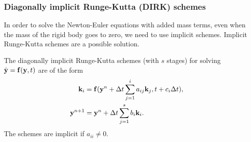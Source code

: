 \subsubsection{Diagonally implicit Runge-Kutta (DIRK) schemes}  \label{sec:DIRK}

In order to solve the Newton-Euler equations with added mass terms, even when the mass of the
rigid body goes to zero, we need to use implicit schemes. Implicit Runge-Kutta schemes are a possible solution.


The diagonally implicit Runge-Kutta schemes (with $s$ stages) for solving $\dot {\mathbf{ y}}=\mathbf{ f}(\mathbf{ y},t)$ are of the form
\begin{align}
   \mathbf{ k}_i &= \mathbf{ f}(\mathbf{ y}^n + {\Delta t} \sum_{j=1}^i a_{ij} \mathbf{ k}_j, t+c_i{\Delta t}),   \label{eq:kRK} \\
   \mathbf{ y}^{n+1} &= \mathbf{ y}^n + {\Delta t} \sum_{j=1}^s b_i \mathbf{ k}_i .
\end{align}
The schemes are implicit if $a_{ii}\ne 0$. 

